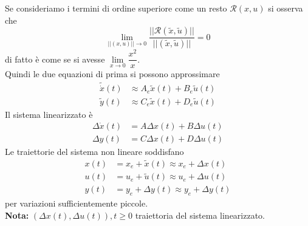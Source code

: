 \documentclass{article}
\numberwithin{equation}{subsection}
\begin{document}
Se consideriamo i termini di ordine superiore come un resto $\mathcal{R}(x,u)$ si osserva che
\begin{equation}
    \lim_{||(x,u)||\rightarrow 0} \frac{||\mathcal{R}(\tilde{x},\tilde{u})||}{||(\tilde{x},\tilde{u})||} = 0
\end{equation}
di fatto è come se si avesse $\lim\limits_{x \rightarrow 0}\dfrac{x^2}{x}$.\\
Quindi le due equazioni di prima si possono approssimare
\begin{align*}
    \tilde{\dot x}(t) &\approx A_e \tilde{x}(t) + B_e \tilde{u}(t)\\
    \tilde{y}(t) &\approx C_e \tilde{x}(t) + D_e\tilde{u}(t) 
\end{align*}
Il sistema linearizzato è
\begin{align*}
    \Delta \dot x(t) &= A \Delta x(t) + B \Delta u(t)\\
    \Delta y(t) &= C \Delta x(t) + D \Delta u(t)
\end{align*} 
Le traiettorie del sistema non lineare soddisfano
\begin{align*}
    x(t) &= x_e + \tilde{x}(t) \approx x_e + \Delta x(t)\\
    u(t) &= u_e + \tilde{u}(t) \approx u_e + \Delta u(t)\\
    y(t) &= y_e + \Delta y(t) \approx y_e + \Delta y(t) 
\end{align*}
per variazioni sufficientemente piccole.
\vspace*{0.1cm}\\
\textbf{Nota:} $(\Delta x(t),\Delta u(t)), t \geq 0$ traiettoria del sistema linearizzato.
\end{document}
